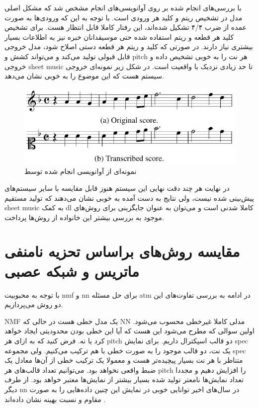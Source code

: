 با بررسی‌های انجام شده بر روی آوانویسی‌های انجام مشخص شد که مشکل اصلی مدل در
تشخیص ریتم و کلید هر ورودی است. با توجه به این که ورودی‌ها به صورت عمده از ضرب
۴/۴ تشکیل شده‌اند، این رفتار کاملا قابل انتظار هست. برای تشخیص کلید هر قطعه و
ریتم استفاده شده حتی موسیقدانان خبره نیز به اطلاعات بسیار بیشتری نیاز دارند. در
صورتی که کلید و ریتم هر قطعه دستی اصلاح شود، مدل خروجی قابل قبولی تولید می‌کند و
می‌تواند کشش و \gls{pitch} هر نت را به خوبی تشخیص داده و خروجی \gls{sheet music}
تا حد زیادی نزدیک با واقعیت است. در شکل زیر نمونه‌ای خروجی سیستم هست که این
موضوع را به خوبی نشان می‌دهد.
\begin{figure}[ht]
    \centering
    \includegraphics[width=12cm]{./statics/roman2018end_output.png}
    \caption{نمونه‌ای از آوانویسی انجام شده توسط \cite{roman2018end}}
\end{figure}

در نهایت هر چند دقت نهایی این سیستم هنوز قابل مقایسه با سایر سیستم‌های پیش‌بینی
شده نیست، ولی نتایج به دست آمده به خوبی نشان می‌دهند که تولید مستقیم \gls{sheet
music} به کمک \gls{dl} کاملا شدنی است و می‌توان به عنوان جایگزینی برای روش‌های
موجود به بررسی بیشتر این خانواده از روش‌ها پرداخت.

\section{مقایسه روش‌های براساس تحزیه نامنفی ماتریس و شبکه عصبی}
با توجه به محبوبیت \gls{nmf} و \gls{nn} برای حل مسئله \gls{atm} در ادامه به
بررسی تفاوت‌های این دو روش می‌پردازیم.

\gls{NMF} یک مدل خطی هست در حالی که \gls{NN} مدلی کاملا غیرخطی محسوب می‌شود.
اولین سوالی که مطرح می‌شود این هست که آیا این خطی بودن محدودیتی ایجاد خواهد کرد
یا نه. فرض کنید که به ازای هر \gls{pitch} دو قالب اسپکترال داریم. برای نمایش
\gls{spec} یک نت، دو قالب موجود را به صورت خطی با هم ترکیب می‌کنیم. ولی مجموعه
\gls{spec} متناظر با هر نت بسیار پیچیده‌تر هست و معمولا یک ترکیب خطی از آن‌ها
معادل یک ضبط واقعی نخواهد بود. می‌توانیم تعداد قالب‌های هر \gls{pitch} را افزایش
دهیم و مجددا تعداد نمایش‌ها نامعتر تولید شده بسیار بیشتر از نمایش‌ها معتبر خواهد
بود. از طرف دیگر \gls{nn} در سال‌های اخیر توانایی خوبی در نمایش این چنین
داده‌هایی را به صورت مقاوم و نسبت بهینه نشان داده‌اند \cite{goodfellow2016deep}.

